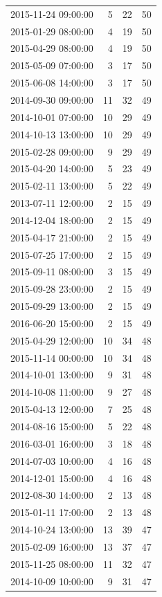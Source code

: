 \begin{tabular}{lrrr}
2015-11-24 09:00:00 & 5 & 22 & 50 \\
2015-01-29 08:00:00 & 4 & 19 & 50 \\
2015-04-29 08:00:00 & 4 & 19 & 50 \\
2015-05-09 07:00:00 & 3 & 17 & 50 \\
2015-06-08 14:00:00 & 3 & 17 & 50 \\
2014-09-30 09:00:00 & 11 & 32 & 49 \\
2014-10-01 07:00:00 & 10 & 29 & 49 \\
2014-10-13 13:00:00 & 10 & 29 & 49 \\
2015-02-28 09:00:00 & 9 & 29 & 49 \\
2015-04-20 14:00:00 & 5 & 23 & 49 \\
2015-02-11 13:00:00 & 5 & 22 & 49 \\
2013-07-11 12:00:00 & 2 & 15 & 49 \\
2014-12-04 18:00:00 & 2 & 15 & 49 \\
2015-04-17 21:00:00 & 2 & 15 & 49 \\
2015-07-25 17:00:00 & 2 & 15 & 49 \\
2015-09-11 08:00:00 & 3 & 15 & 49 \\
2015-09-28 23:00:00 & 2 & 15 & 49 \\
2015-09-29 13:00:00 & 2 & 15 & 49 \\
2016-06-20 15:00:00 & 2 & 15 & 49 \\
2015-04-29 12:00:00 & 10 & 34 & 48 \\
2015-11-14 00:00:00 & 10 & 34 & 48 \\
2014-10-01 13:00:00 & 9 & 31 & 48 \\
2014-10-08 11:00:00 & 9 & 27 & 48 \\
2015-04-13 12:00:00 & 7 & 25 & 48 \\
2014-08-16 15:00:00 & 5 & 22 & 48 \\
2016-03-01 16:00:00 & 3 & 18 & 48 \\
2014-07-03 10:00:00 & 4 & 16 & 48 \\
2014-12-01 15:00:00 & 4 & 16 & 48 \\
2012-08-30 14:00:00 & 2 & 13 & 48 \\
2015-01-11 17:00:00 & 2 & 13 & 48 \\
2014-10-24 13:00:00 & 13 & 39 & 47 \\
2015-02-09 16:00:00 & 13 & 37 & 47 \\
2015-11-25 08:00:00 & 11 & 32 & 47 \\
2014-10-09 10:00:00 & 9 & 31 & 47 \\

\end{tabular}
